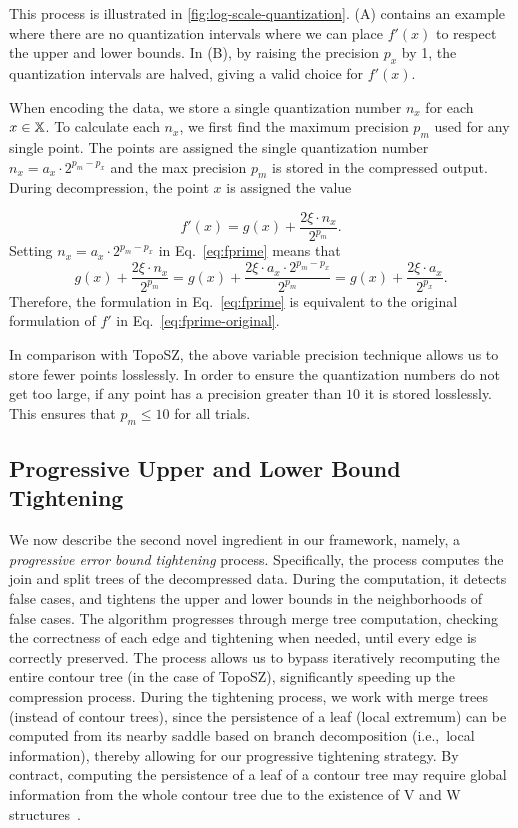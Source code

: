 This process is illustrated in \cref{fig:log-scale-quantization}. 
(A) contains an example where there are no quantization intervals where we can place $f'(x)$ to respect the upper and lower bounds. 
In (B), by raising the precision $p_x$ by 1, the quantization intervals are halved, giving a valid choice for $f'(x)$.

When encoding the data, we store a single quantization number $n_x$ for each $x \in \mathbb{X}$. 
To calculate each $n_x$, we first find the maximum precision $p_m$ used for any single point. The points are assigned the single quantization number $n_x = a_x \cdot 2^{p_m-p_x}$ and the max precision $p_m$ is stored in the compressed output. 
During decompression, the point $x$ is assigned the value 

\begin{equation}
f'(x) = g(x) + \frac{2\xi \cdot n_x}{2^{p_m}}.
\label{eq:fprime}
\end{equation}
Setting $n_x = a_x \cdot 2^{p_m-p_x}$ in Eq.~\eqref{eq:fprime} means that
\begin{equation*}
  g(x) + \frac{2\xi \cdot n_x}{2^{p_m}} = g(x) + \frac{2\xi \cdot a_x \cdot 2^{p_m-p_x}}{2^{p_m}} = g(x) + \frac{2\xi \cdot a_x}{2^{p_x}}.
  \label{eq:logscale}  
\end{equation*}
Therefore, the formulation in Eq.~\eqref{eq:fprime} is equivalent to the original formulation of $f'$ in Eq.~\eqref{eq:fprime-original}.

In comparison with TopoSZ, the above variable precision technique allows us to store fewer points losslessly.
In order to ensure the quantization numbers do not get too large, if any point has a precision greater than $10$ it is stored losslessly. This ensures that $p_m \leq 10$ for all trials.

\subsection{Progressive Upper and Lower Bound Tightening}
\label{sec:augment-tightening}

We now describe the second novel ingredient in our framework, namely, a \emph{progressive error bound tightening} process. 
Specifically, the process computes the join and split trees of the decompressed data. During the computation, it detects false cases, and tightens the upper and lower bounds in the neighborhoods of false cases. The algorithm progresses through merge tree computation, checking the correctness of each edge and tightening when needed, until every edge is correctly preserved.
The process allows us to bypass iteratively recomputing the entire contour tree (in the case of TopoSZ), significantly speeding up the compression process. During the tightening process, we work with merge trees (instead of contour trees), since the persistence of a leaf (local extremum) can be computed from its nearby saddle based on branch decomposition (i.e.,~local information), thereby allowing for our progressive tightening strategy. By contract, computing the persistence of a leaf of a contour tree may require global information from the whole contour tree due to the existence of V and W structures~\cite{hristov2021w}.


